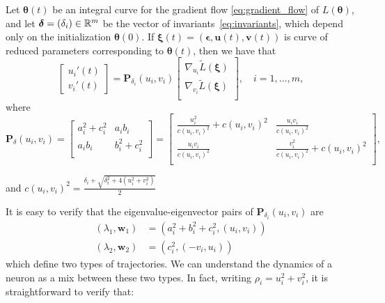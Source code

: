 \begin{theorem}\label{thm:reduced_parameter_grad}
Let $\bm \theta(t)$ be an integral curve for the gradient flow \eqref{eq:gradient_flow} of $L(\bm \theta)$, and let $\bm \delta = (\delta_i) \in \mathbb{R}^m$ be the vector of invariants~\eqref{eq:invariants}, which depend only on the initialization $\bm \theta(0)$. If $\bm \xi(t) = (\bm \epsilon, \bm u(t), \bm v(t))$ is curve of reduced parameters corresponding to $\bm \theta(t)$, then we have that
\begin{equation}
\begin{bmatrix}
u_i'(t)\\
v_i'(t)
\end{bmatrix} =
\bm P_{\delta_i}(u_i,v_i)
\begin{bmatrix}
\nabla_{u_i} \tilde L (\bm \xi)\\
\nabla_{v_i} \tilde L (\bm \xi)\\
\end{bmatrix},
\quad i=1,\ldots,m,
\end{equation}
where
\begin{equation}\label{eq:neuron_kernel}
\bm P_\delta(u_i,v_i) = \begin{bmatrix}
    a_i^2 + c_i^2  & 
    a_i b_i        \\
    a_i b_i               & 
    b_i^2 + c_i^2\\
\end{bmatrix} = 
\begin{bmatrix}
\frac{u_i^2}{c(u_i, v_i)^2} + c(u_i, v_i)^2 & \frac{u_i v_i}{c(u_i, v_i)^2}\\
\frac{u_i v_i}{c(u_i, v_i)^2} &  \frac{v_i^2}{c(u_i, v_i)^2} + c(u_i, v_i)^2\\
\end{bmatrix},
\end{equation}

and $c(u_i, v_i)^2 = \frac{\delta_i + \sqrt{\delta_i^2 + 4 (u_i^2 + v_i^2)}}{2}$
\end{theorem}

It is easy to verify that the eigenvalue-eigenvector pairs of $\bm P_{\delta_i}(u_i,v_i)$ are
\begin{align}
    (\lambda_1, \bm w_1) &= (a_i^2+ b_i^2 + c_i^2, (u_i,v_i))
    \label{eq:radial_eigenval}\\
    (\lambda_2, \bm w_2) &= (c_i^2, (-v_i,u_i)) 
    \label{eq:tangential_eigenval}
\end{align}
which define two types of trajectories. We can understand the dynamics of a neuron as a mix between these two types. In fact, writing $\rho_i = u_i^2 + v_i^2$, it is straightforward to verify that:

